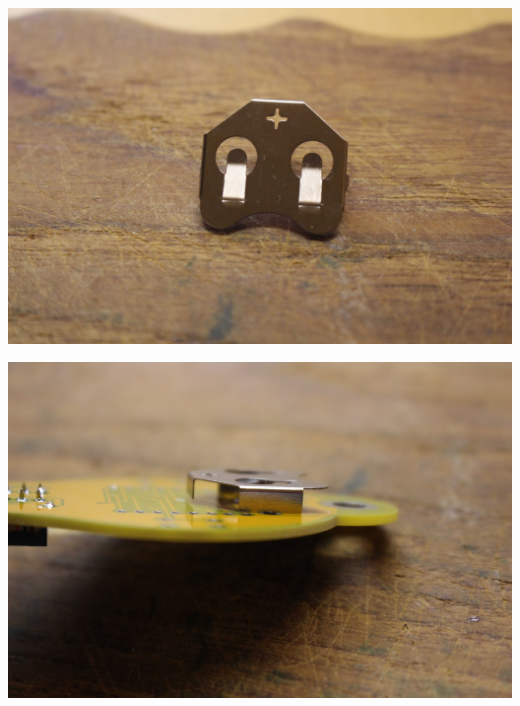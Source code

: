 \documentclass{article}
\begin{document}
\begin{minipage}[b]{0.5\textwidth}
	\includegraphics[width=\textwidth]{Bilder/IMG_5565.JPG}
	\label{fig:}
\end{minipage}
\begin{minipage}[b]{0.5\textwidth}
	\includegraphics[width=\textwidth]{Bilder/IMG_5566.JPG}
	\label{fig:}
\end{minipage}
\end{document}
